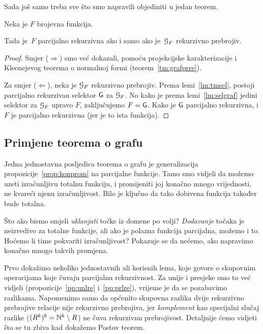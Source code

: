 Sada još samo treba sve što smo napravili objediniti u jedan teorem.

\begin{teorem}\label{tm:graf}
Neka je $F$ brojevna funkcija.

Tada je \,$F$ parcijalno rekurzivna ako i samo ako je \,$\mathcal G_{F}$ rekurzivno prebrojiv.
\end{teorem}
\begin{proof}
Smjer ($\Rightarrow$) smo već dokazali, pomoću projekcijske karakterizacije i Kleenejevog teorema o normalnoj formi (teorem~\ref{tm:grafprre}).

Za smjer ($\Leftarrow$), neka je $\mathcal G_{F}$ rekurzivno prebrojiv. Prema lemi~\ref{lm:tmsel}, postoji parcijalno rekurzivan selektor $\f G$ za $\mathcal G_{F}$. No kako je prema lemi~\ref{lm:selgraf} jedini selektor za $\mathcal G_{F}$ upravo $F$, zaključujemo $F=\f G$. Kako je $\f G$ parcijalno rekurzivna, i $F$ je parcijalno rekurzivna (jer je to ista funkcija).
\end{proof}

\subsection{Primjene teorema o grafu}

Jedna jednostavna posljedica teorema o grafu je generalizacija propozicije~\ref{prop:konprom} na parcijalne funkcije. Tamo smo vidjeli da možemo uzeti izračunljivu totalnu funkciju, i promijeniti joj konačno mnogo vrijednosti, ne kvareći njenu izračunljivost. Bilo je ključno da tako dobivena funkcija također bude totalna.

Što ako bismo smjeli \emph{uklanjati} točke iz domene po volji? \emph{Dodavanje} točaka je neizvedivo za totalne funkcije, ali ako je polazna funkcija parcijalna, možemo i to. Hoćemo li time pokvariti izračunljivost? Pokazuje se da nećemo, ako napravimo konačno mnogo takvih promjena.

Prvo dokažimo nekoliko jednostavnih ali korisnih lema, koje govore o skupovnim operacijama koje čuvaju parcijalnu rekurzivnost. Za unije i presjeke smo to već vidjeli (propozicije~\ref{pp:unlre} i~\ref{pp:prlre}), vrijeme je da se pozabavimo razlikama. Napomenimo samo da općenito skupovna razlika dvije rekurzivno prebrojive relacije nije rekurzivno prebrojiva, jer \emph{komplement} kao specijalni slučaj razlike ($(R^k)\sp{{\scriptscriptstyle\complement}}={\mathbb N}^k\setminus R$) ne čuva rekurzivnu prebrojivost. Detaljnije ćemo vidjeti što se tu zbiva kad dokažemo Postov teorem.

